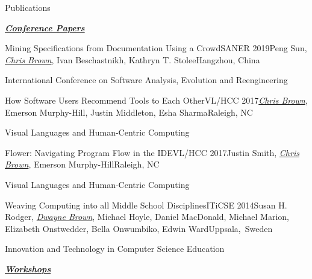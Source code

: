 \documentclass{resume} %
\begin{document}
\begin{rSection}{Publications}

\underline{\textbf{\textit{Conference Papers}}}

\begin{pSubsection}{Mining Specifications from Documentation Using a Crowd}{SANER 2019}{Peng Sun, \textit{\underline{Chris Brown}}, Ivan Beschastnikh, Kathryn T. Stolee}{Hangzhou, China}
\item International Conference on Software Analysis, Evolution and Reengineering
\end{pSubsection}


\begin{pSubsection}{How Software Users Recommend Tools to Each Other}{VL/HCC 2017}{\textit{\underline{Chris Brown}}, Emerson Murphy-Hill, Justin Middleton, Esha Sharma}{Raleigh, NC}
\item Visual Languages and Human-Centric Computing
\end{pSubsection}


\begin{pSubsection}{Flower: Navigating Program Flow in the IDE}{VL/HCC 2017}{Justin Smith, \textit{\underline{Chris Brown}}, Emerson Murphy-Hill}{Raleigh, NC}
\item Visual Languages and Human-Centric Computing
\end{pSubsection}


\begin{pSubsection}{Weaving Computing into all Middle School Disciplines}{ITiCSE 2014}{Susan H. Rodger, \textit{\underline{Dwayne Brown}}, Michael Hoyle, Daniel MacDonald, Michael Marion, Elizabeth Onstwedder, Bella Onwumbiko, Edwin Ward}{Uppsala,~Sweden}
\item Innovation and Technology in Computer Science Education
\end{pSubsection}

\underline{\textbf{\textit{Workshops}}}


\end{rSection}
\end{document}
